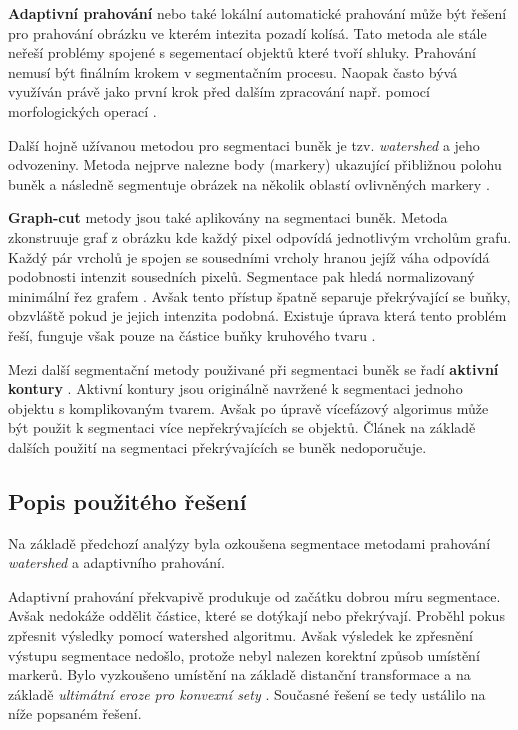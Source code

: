 \documentclass[11pt,twoside,a4paper,table]{book}
\begin{document}
\textbf{Adaptivní prahování} nebo také lokální automatické prahování může být řešení pro prahování obrázku ve kterém intezita pozadí kolísá. Tato metoda ale stále neřeší problémy spojené s segementací objektů které tvoří shluky. Prahování nemusí být finálním krokem v segmentačním procesu. Naopak často bývá využíván právě jako první krok před dalším zpracování např. pomocí morfologických operací \cite{book:imgproc_gonzalez} \cite{book:art:wahlby}.

Další hojně užívanou metodou pro segmentaci buněk je tzv. \textit{watershed} a jeho odvozeniny. Metoda nejprve nalezne body (markery) ukazující přibližnou polohu buněk a následně segmentuje obrázek na několik oblastí ovlivněných markery \cite{art:watershed1} \cite{art:watershed2} \cite{art:watershed3} \cite{art:wahlby}.

\textbf{Graph-cut} metody jsou také aplikovány na segmentaci buněk. Metoda zkonstruuje graf z obrázku kde každý pixel odpovídá jednotlivým vrcholům grafu. Každý pár vrcholů je spojen se sousedními vrcholy hranou jejíž váha odpovídá podobnosti intenzit sousedních pixelů. Segmentace pak hledá normalizovaný minimální řez grafem \cite{art:grabcut1}. Avšak tento přístup špatně separuje překrývající se buňky, obzvláště pokud je jejich intenzita podobná. Existuje úprava která tento problém řeší, funguje však pouze na částice buňky kruhového tvaru \cite{art:ultimate}.

Mezi další segmentační metody použivané při segmentaci buněk se řadí \textbf{aktivní kontury} \cite{art:active_contours1} \cite{art:active_contours2}. Aktivní kontury jsou originálně navržené k segmentaci jednoho objektu s komplikovaným tvarem. Avšak po úpravě vícefázový algorimus může být použit k segmentaci více nepřekrývajících se objektů. Článek \cite{art:ultimate} na základě dalších použití na segmentaci překrývajících se buněk nedoporučuje.

\subsection{Popis použitého řešení}

Na základě předchozí analýzy byla ozkoušena segmentace metodami prahování \textit{watershed} a adaptivního prahování.

Adaptivní prahování překvapivě produkuje od začátku dobrou míru segmentace. Avšak nedokáže oddělit částice, které se dotýkají nebo překrývají. Proběhl pokus zpřesnit výsledky pomocí watershed algoritmu. Avšak výsledek ke zpřesnění výstupu segmentace nedošlo, protože nebyl nalezen korektní způsob umístění markerů. Bylo vyzkoušeno umístění na základě distanční transformace \cite{opencv:watertut} a na základě \textit{ultimátní eroze pro konvexní sety } \cite{art:ultimate}. Současné řešení se tedy ustálilo na níže popsaném řešení.
\end{document}
